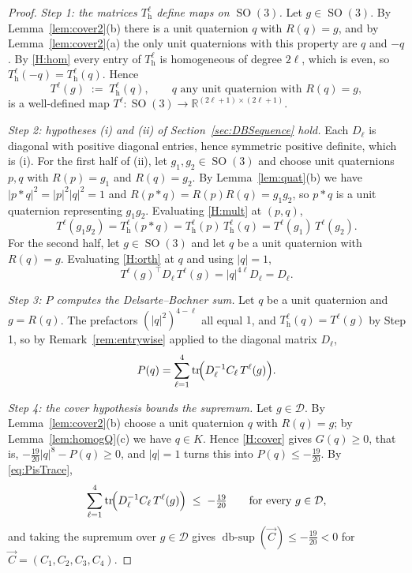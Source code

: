 \documentclass[reqno]{amsart}
\theoremstyle{definition}
\DeclareMathOperator{\SO}{SO}
\DeclareMathOperator{\tr}{tr}
\DeclareMathOperator{\dbsup}{db\text{-}sup}
\newcommand{\R}{\mathbb{R}}
\newcommand{\Dom}{\mathcal{D}}
\begin{document}
\begin{proof} 
\emph{Step 1: the matrices $T^\ell_{\mathrm h}$ define maps on $\SO(3)$.}
Let $g\in\SO(3)$. By Lemma~\ref{lem:cover2}(b) there is a unit quaternion $q$ with $R(q)=g$, and by
Lemma~\ref{lem:cover2}(a) the only unit quaternions with this property are $q$ and $-q$. By
\ref{H:hom} every entry of $T^\ell_{\mathrm h}$ is homogeneous of degree $2\ell$, which is even, so
$T^\ell_{\mathrm h}(-q)=T^\ell_{\mathrm h}(q)$. Hence
\[
T^\ell(g)\;:=\;T^\ell_{\mathrm h}(q),\qquad q \text{ any unit quaternion with } R(q)=g,
\]
is a well-defined map $T^\ell:\SO(3)\to\R^{(2\ell+1)\times(2\ell+1)}$.

\emph{Step 2: hypotheses (i) and (ii) of Section~\ref{sec:DBSequence} hold.}
Each $D_\ell$ is diagonal with positive diagonal entries, hence symmetric positive definite, which
is (i). For the first half of (ii), let $g_1,g_2\in\SO(3)$ and choose unit quaternions $p,q$ with
$R(p)=g_1$ and $R(q)=g_2$. By Lemma~\ref{lem:quat}(b) we have $|p*q|^2=|p|^2|q|^2=1$ and
$R(p*q)=R(p)R(q)=g_1g_2$, so $p*q$ is a unit quaternion representing $g_1g_2$. Evaluating
\ref{H:mult} at $(p,q)$,
\[
T^\ell(g_1g_2)=T^\ell_{\mathrm h}(p*q)=T^\ell_{\mathrm h}(p)\,T^\ell_{\mathrm h}(q)
=T^\ell(g_1)\,T^\ell(g_2).
\]
For the second half, let $g\in\SO(3)$ and let $q$ be a unit quaternion with $R(q)=g$. Evaluating
\ref{H:orth} at $q$ and using $|q|=1$,
\[
T^\ell(g)^\top D_\ell\,T^\ell(g)=|q|^{4\ell}D_\ell=D_\ell .
\]

\emph{Step 3: $P$ computes the Delsarte--Bochner sum.}
Let $q$ be a unit quaternion and $g=R(q)$. The prefactors $(|q|^2)^{4-\ell}$ all equal $1$, and
$T^\ell_{\mathrm h}(q)=T^\ell(g)$ by Step 1, so by Remark~\ref{rem:entrywise} applied to the
diagonal matrix $D_\ell$,
\begin{equation}\label{eq:PisTrace}
P(q)=\sum_{\ell=1}^{4}\tr\!\Bigl(D_\ell^{-1}C_\ell\,T^\ell(g)\Bigr).
\end{equation}

\emph{Step 4: the cover hypothesis bounds the supremum.}
Let $g\in\Dom$. By Lemma~\ref{lem:cover2}(b) choose a unit quaternion $q$ with $R(q)=g$; by
Lemma~\ref{lem:homogQ}(c) we have $q\in K$. Hence \ref{H:cover} gives $G(q)\ge0$, that is,
$-\tfrac{19}{20}|q|^{8}-P(q)\ge0$, and $|q|=1$ turns this into $P(q)\le-\tfrac{19}{20}$. By
\eqref{eq:PisTrace},
\[
\sum_{\ell=1}^{4}\tr\!\Bigl(D_\ell^{-1}C_\ell\,T^\ell(g)\Bigr)\;\le\;-\tfrac{19}{20}
\qquad\text{for every }g\in\Dom ,
\]
and taking the supremum over $g\in\Dom$ gives
$\dbsup(\overrightarrow C)\le-\tfrac{19}{20}<0$ for $\overrightarrow C=(C_1,C_2,C_3,C_4)$.


\end{proof}
\end{document}
